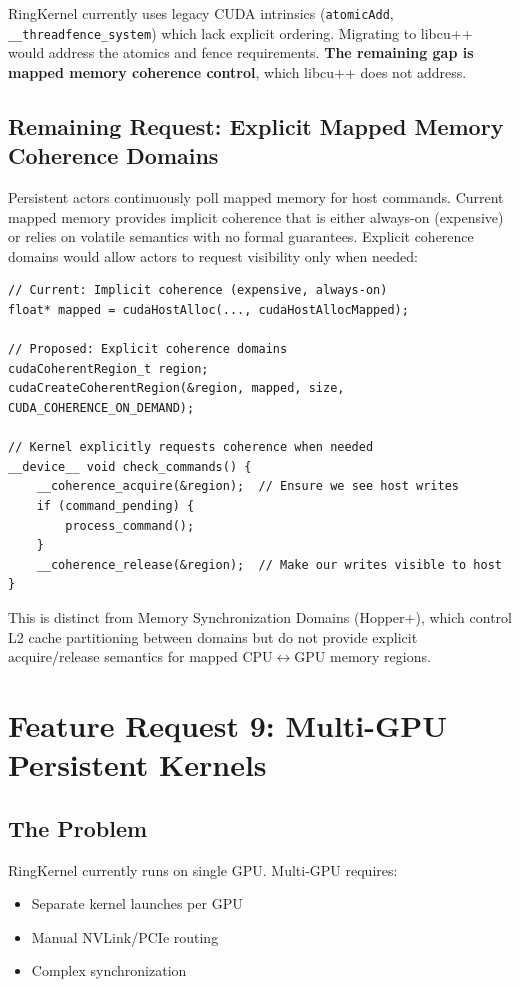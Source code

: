 \documentclass[11pt,a4paper]{article}
\begin{document}
RingKernel currently uses legacy CUDA intrinsics (\texttt{atomicAdd}, \texttt{\_\_threadfence\_system}) which lack explicit ordering. Migrating to libcu++ would address the atomics and fence requirements. \textbf{The remaining gap is mapped memory coherence control}, which libcu++ does not address.

\subsection{Remaining Request: Explicit Mapped Memory Coherence Domains}

Persistent actors continuously poll mapped memory for host commands. Current mapped memory provides implicit coherence that is either always-on (expensive) or relies on volatile semantics with no formal guarantees. Explicit coherence domains would allow actors to request visibility only when needed:

\begin{lstlisting}[style=cstyle]
// Current: Implicit coherence (expensive, always-on)
float* mapped = cudaHostAlloc(..., cudaHostAllocMapped);

// Proposed: Explicit coherence domains
cudaCoherentRegion_t region;
cudaCreateCoherentRegion(&region, mapped, size, CUDA_COHERENCE_ON_DEMAND);

// Kernel explicitly requests coherence when needed
__device__ void check_commands() {
    __coherence_acquire(&region);  // Ensure we see host writes
    if (command_pending) {
        process_command();
    }
    __coherence_release(&region);  // Make our writes visible to host
}
\end{lstlisting}

This is distinct from Memory Synchronization Domains (Hopper+), which control L2 cache partitioning between domains but do not provide explicit acquire/release semantics for mapped CPU$\leftrightarrow$GPU memory regions.

\newpage

\section{Feature Request 9: Multi-GPU Persistent Kernels}

\subsection{The Problem}

RingKernel currently runs on single GPU. Multi-GPU requires:
\begin{itemize}[leftmargin=*]
    \item Separate kernel launches per GPU
    \item Manual NVLink/PCIe routing
    \item Complex synchronization
\end{itemize}
\end{document}
